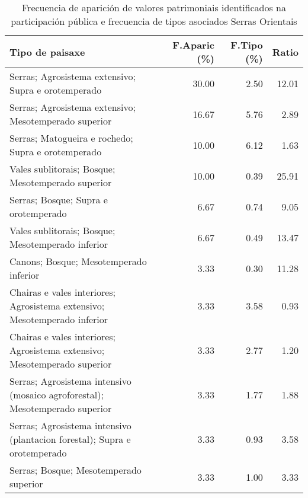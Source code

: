 \begin{table}[p]
\centering
\caption{Frecuencia de aparición de valores patrimoniais identificados na participación pública e frecuencia de tipos asociados Serras Orientais} 
\label{vsixotpat5}
\begin{tabular}{lrrr}
  \hline
Tipo de paisaxe & F.Aparic (\%) & F.Tipo (\%) & Ratio \\ 
  \hline
Serras; Agrosistema extensivo; Supra e orotemperado & 30.00 & 2.50 & 12.01 \\ 
  Serras; Agrosistema extensivo; Mesotemperado superior & 16.67 & 5.76 & 2.89 \\ 
  Serras; Matogueira e rochedo; Supra e orotemperado & 10.00 & 6.12 & 1.63 \\ 
  Vales sublitorais; Bosque; Mesotemperado superior & 10.00 & 0.39 & 25.91 \\ 
  Serras; Bosque; Supra e orotemperado & 6.67 & 0.74 & 9.05 \\ 
  Vales sublitorais; Bosque; Mesotemperado inferior & 6.67 & 0.49 & 13.47 \\ 
  Canons; Bosque; Mesotemperado inferior & 3.33 & 0.30 & 11.28 \\ 
  Chairas e vales interiores; Agrosistema extensivo; Mesotemperado inferior & 3.33 & 3.58 & 0.93 \\ 
  Chairas e vales interiores; Agrosistema extensivo; Mesotemperado superior & 3.33 & 2.77 & 1.20 \\ 
  Serras; Agrosistema intensivo (mosaico agroforestal); Mesotemperado superior & 3.33 & 1.77 & 1.88 \\ 
  Serras; Agrosistema intensivo (plantacion forestal); Supra e orotemperado & 3.33 & 0.93 & 3.58 \\ 
  Serras; Bosque; Mesotemperado superior & 3.33 & 1.00 & 3.33 \\ 
   \hline
\end{tabular}
\end{table}

